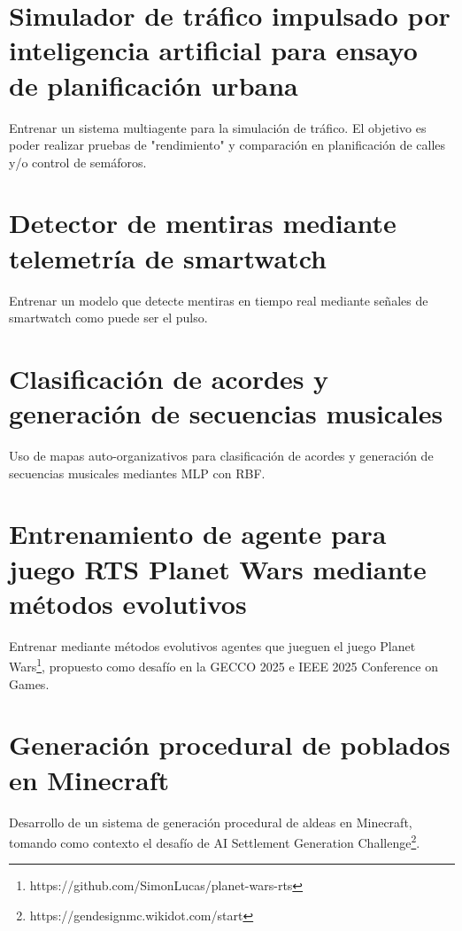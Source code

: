 \documentclass[final]{article}
\begin{document}
\section{Simulador de tráfico impulsado por inteligencia artificial para ensayo de planificación urbana}
Entrenar un sistema multiagente para la simulación de tráfico. El objetivo es poder realizar pruebas de "rendimiento" y comparación en planificación de calles y/o control de semáforos.

\section{Detector de mentiras mediante telemetría de smartwatch}
Entrenar un modelo que detecte mentiras en tiempo real mediante señales de smartwatch como puede ser el pulso.

\section{Clasificación de acordes y generación de secuencias musicales}
Uso de mapas auto-organizativos para clasificación de acordes y generación de secuencias musicales mediantes MLP con RBF.

\section{Entrenamiento de agente para juego RTS Planet Wars mediante métodos evolutivos}
Entrenar mediante métodos evolutivos agentes que jueguen el juego Planet Wars\footnote{https://github.com/SimonLucas/planet-wars-rts}, propuesto como desafío en la GECCO 2025 e IEEE 2025 Conference on Games.

\section{Generación procedural de poblados en Minecraft}
Desarrollo de un sistema de generación procedural de aldeas en Minecraft, tomando como contexto el desafío de AI Settlement Generation Challenge\footnote{https://gendesignmc.wikidot.com/start}.
\end{document}
